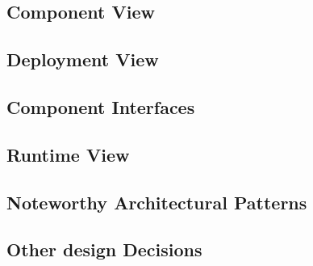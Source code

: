 \subsection{Component View}
\subsection{Deployment View}
\subsection{Component Interfaces}
\subsection{Runtime View}
\subsection{Noteworthy Architectural Patterns}
\subsection{Other design Decisions}